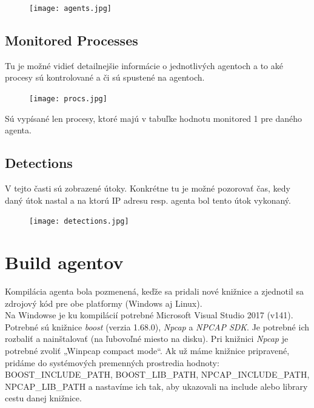\documentclass[a4paper,12pt]{article}
\begin{document}
\begin{figure}[h]
	\centering
	\texttt{[image: agents.jpg]}
\end{figure}

\subsection{Monitored Processes}
Tu je možné vidieť detailnejšie informácie o jednotlivých agentoch a to aké procesy sú kontrolované a či sú spustené na agentoch. \\

\begin{figure}[h]
	\centering
	\texttt{[image: procs.jpg]}
\end{figure}
Sú vypísané len procesy, ktoré majú v tabuľke hodnotu monitored 1 pre daného agenta. \\

\subsection{Detections}
V tejto časti sú zobrazené útoky. Konkrétne tu je možné pozorovať čas, kedy daný útok nastal a na ktorú IP adresu resp. agenta bol tento útok vykonaný. \\

\begin{figure}[h!]
	\centering
	\texttt{[image: detections.jpg]}
\end{figure}




\section{Build agentov}
Kompilácia agenta bola pozmenená, keďže sa pridali nové knižnice a zjednotil sa zdrojový kód pre obe platformy (Windows aj Linux). \\

Na Windowse je ku kompilácií potrebné Microsoft Visual Studio 2017 (v141).
Potrebné sú knižnice \textit{boost} (verzia 1.68.0), \textit{Npcap} a \textit{NPCAP SDK}. Je potrebné ich rozbaliť a nainštalovať (na ľubovoľné miesto na disku).  Pri knižnici \textit{Npcap} je potrebné zvoliť „Winpcap compact mode“. Ak už máme knižnice pripravené, pridáme do systémových premenných prostredia hodnoty: BOOST\_INCLUDE\_PATH, BOOST\_LIB\_PATH, NPCAP\_INCLUDE\_PATH, NPCAP\_LIB\_PATH a nastavíme ich tak, aby ukazovali na include alebo library cestu danej knižnice. \\
\end{document}
